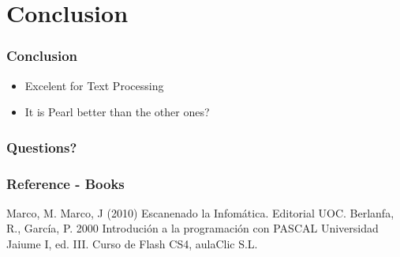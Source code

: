 \documentclass{beamer}
\begin{document}
\section{Conclusion}
\begin{frame}
 \frametitle{Conclusion}
\begin{itemize}
\item Excelent for Text Processing
\item It is Pearl better than the other ones?
\end{itemize}
\end{frame}
\begin{frame}
 \frametitle{Questions?}
\end{frame}
\begin{frame}
 \frametitle{Reference - Books}
\begin{thebibliography}{10}
Marco, M. Marco, J (2010) Escanenado la Infomática. Editorial UOC. 
Berlanfa, R., García, P. 2000 Introdución a la programación con PASCAL Universidad Jaiume I, ed. III.
Curso de Flash CS4, aulaClic S.L.
\end{thebibliography}
\end{frame}
\end{document}
